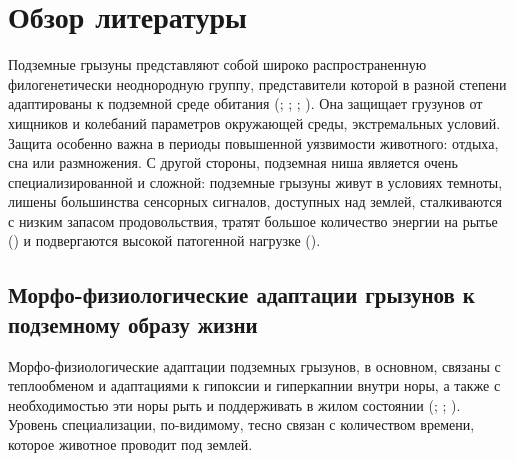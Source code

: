 \chapter{Обзор литературы} \label{lit_review}


Подземные грызуны представляют собой широко распространенную филогенетически неоднородную группу, представители которой в разной степени адаптированы к подземной среде обитания (\cite{Nevo1990}; \cite{Nevo1999}; \cite{Lacey2000}; \cite{Begall2007}). Она защищает грузунов от хищников и колебаний параметров окружающей среды, экстремальных условий. Защита особенно важна в периоды повышенной уязвимости животного: отдыха, сна или размножения. С другой стороны, подземная ниша является очень специализированной и сложной: подземные грызуны живут в условиях темноты, лишены большинства сенсорных сигналов, доступных над землей, сталкиваются с низким запасом продовольствия, тратят большое количество энергии на рытье (\cite{Begall2007}) и подвергаются высокой патогенной нагрузке (\cite{Nevo1999}).


\section{Морфо-физиологические адаптации грызунов к подземному образу жизни}

Морфо-физиологические адаптации подземных грызунов, в основном, связаны с теплообменом и адаптациями к гипоксии и гиперкапнии внутри норы, а также с необходимостью эти норы рыть и поддерживать в жилом состоянии (\cite{Gambaryan1957}; \cite{Nevo1999}; \cite{McNab1966}). Уровень специализации, по-видимому, тесно связан с количеством времени, которое животное проводит под землей. 


